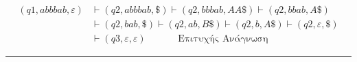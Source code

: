 \begin{tcolorbox}[colback=yellow!15!white, colframe=blue!50!white,
	fonttitle=\bfseries\Large, title = {Υπολογισμός αποδοχής $abbbab$}]
	\reducevspace\reducevspace\reducevspace\reducevspace\reducevspace\reducevspace\reducevspace\reducevspace
	\reducevspace\reducevspace\reducevspace\reducevspace\reducevspace\reducevspace\reducevspace\reducevspace
	\reducevspace\reducevspace\reducevspace\reducevspace\reducevspace\reducevspace\reducevspace\reducevspace
	\begin{adjustwidth}{-0.75em}{}
		\begin{equation*}
			\begin{aligned}
				(q1, abbbab, \varepsilon)
				&\vdash (q2, abbbab, \$) \vdash (q2, bbbab, AA\$) \vdash (q2, bbab, A\$)\\
				&\vdash (q2, bab, \$) \vdash (q2, ab, B\$) \vdash (q2, b, A\$) \vdash (q2, \varepsilon, \$)\\
				&\vdash (q3, \varepsilon, \varepsilon)\qquad\quad \text{ Επιτυχής Ανάγνωση}
			\end{aligned}
		\end{equation*}
	\end{adjustwidth}
\end{tcolorbox}

\begin{center}
	\noindent\rule{\linewidth}{0.5pt}
\end{center}
